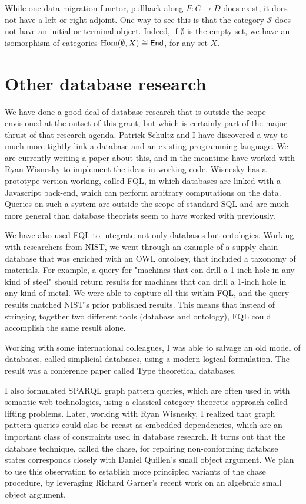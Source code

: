 \documentclass[11pt,oneside,article]{memoir}
\newcommand{\tn}[1]{\textnormal{#1}}
\def\Hom{\tn{Hom}}
\def\End{\mathsf{End}}
\def\S{\mathcal{S}}
\begin{document}
While one data migration functor, pullback along $F\colon C\to D$ does exist, it does not have a left or right adjoint. One way to see this is that the category $\S$ does not have an initial or terminal object. Indeed, if $\emptyset$ is the empty set, we have an isomorphism of categories $\Hom(\emptyset, X)\cong \End$, for any set $X$. 

\section{Other database research}

We have done a good deal of database research that is outside the scope envisioned at the outset of this grant, but which is certainly part of the major thrust of that research agenda. Patrick Schultz and I have discovered a way to much more tightly link a database and an existing programming language. We are currently writing a paper about this, and in the meantime have worked with Ryan Wisnesky to implement the ideas in working code. Wisnesky has a prototype version working, called \href{http://categoricaldata.net/fql.html}{\tn{FQL}}, in which databases are linked with a Javascript back-end, which can perform arbitrary computations on the data. Queries on such a system are outside the scope of standard SQL and are much more general than database theorists seem to have worked with previously. 

We have also used FQL to integrate not only databases but ontologies. Working with researchers from NIST, we went through an example of a supply chain database that was enriched with an OWL ontology, that included a taxonomy of materials. For example, a query for "machines that can drill a 1-inch hole in any kind of steel" should return results for machines that can drill a 1-inch hole in any kind of metal. We were able to capture all this within FQL, and the query results matched NIST's prior published results. This means that instead of stringing together two different tools (database and ontology), FQL could accomplish the same result alone.

Working with some international colleagues, I was able to salvage an old model of databases, called simplicial databases, using a modern logical formulation. The result was a conference paper called Type theoretical databases.

I also formulated SPARQL graph pattern queries, which are often used in with semantic web technologies, using a classical category-theoretic approach called lifting problems. Later, working with Ryan Wisnesky, I realized that graph pattern queries could also be recast as embedded dependencies, which are an important class of constraints used in database research. It turns out that the database technique, called the chase, for repairing non-conforming database states corresponds closely with Daniel Quillen's small object argument. We plan to use this observation to establish more principled variants of the chase procedure, by leveraging Richard Garner's recent work on an algebraic small object argument.
\end{document}
